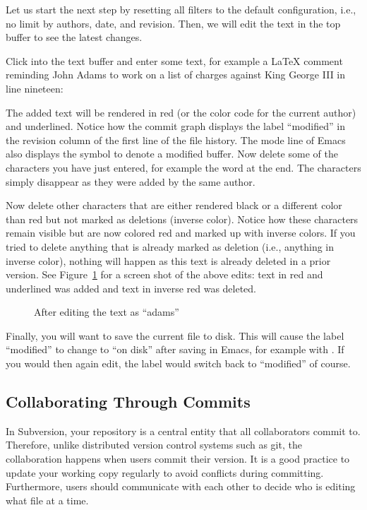 Let us start the next step by resetting all filters to the default configuration, i.e., no limit by authors, date, and revision.  Then, we will edit the text in the top buffer to see the latest changes.

Click into the text buffer and enter some text, for example a LaTeX comment reminding John Adams to work on a list of charges against King George III in line nineteen:
\begin{FileVerbatim}
\end{FileVerbatim}
The added text will be rendered in red (or the color code for the current author) and underlined.  Notice how the commit graph displays the label ``modified'' in the revision column of the first line of the file history.  The mode line of Emacs also displays the symbol \Code{**} to denote a modified buffer. Now delete some of the characters you have just entered, for example the word  at the end.  The characters simply disappear as they were added by the same author.

Now delete other characters that are either rendered black or a different color than red but not marked as deletions (inverse color).  Notice how these characters remain visible but are now colored red and marked up with inverse colors.  If you tried to delete anything that is already marked as deletion (i.e., anything in inverse color), nothing will happen as this text is already deleted in a prior version.  See Figure~\ref{fig:svn-emacs-modified} for a screen shot of the above edits: text in red and underlined was added and text in inverse red was deleted.

\begin{figure}[t]
\centering
{}
\caption{After editing the text as ``adams''} \label{fig:svn-emacs-modified}
\end{figure}

Finally, you will want to save the current file to disk.  This will cause the label ``modified'' to change to ``on disk'' after saving in Emacs, for example with .  If you would then again edit, the label would switch back to ``modified'' of course.

\subsection{Collaborating Through Commits}

In Subversion, your repository is a central entity that all collaborators commit to.  Therefore, unlike distributed version control systems such as git, the collaboration happens when users commit their version.  It is a good practice to update your working copy regularly to avoid conflicts during committing.  Furthermore, users should communicate with each other to decide who is editing what file at a time.

